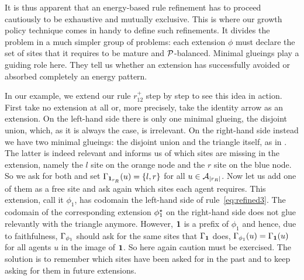 It is thus apparent that
an energy-based rule refinement has to proceed
cautiously to be exhaustive and mutually exclusive. %
This is where our growth policy technique
comes in handy to define such refinements.
It divides the problem in a much simpler group of problems:
each extension $\phi$ must declare the set of sites
that it requires to be mature and $\mathcal{P}$-balanced.
Minimal glueings play a guiding role here.
They tell us whether an extension has successfully
avoided or absorbed completely an energy pattern.

In our example, we extend our rule $r^+_{12}$
step by step to see this idea in action.
First take no extension at all or,
more precisely, take the identity arrow as an extension.
On the left-hand side there is only one minimal glueing,
the disjoint union, which, as it is always the case,
is irrelevant.
On the right-hand side instead we have two minimal glueings:
the disjoint union and the triangle itself,
as in .
The latter is indeed relevant and informs us
of which sites are missing in the extension,
namely the $l$ site on the orange node
and the $r$ site on the blue node.
So we ask for both and set $\Gamma_{\boldsymbol{\mathbf{1}}_{r_R}}(u) = \left\{ l,r \right\}$
for all $u \in \mathcal{A}_{\left|r_R\right|}$.
Now let us add one of them as a free site
and ask again which sites each agent requires.
This extension, call it $\phi_1$, has codomain
the left-hand side of rule~\ref{eq:refined3}.
The codomain of the corresponding extension $\phi_1^\star$
on the right-hand side
does not glue relevantly with the triangle anymore.
However, $\boldsymbol{\mathbf{1}}$ is a prefix of $\phi_1$
and hence, due to faithfulness,
$\Gamma_{\phi_1}$ should ask for the same sites
that $\Gamma_{\boldsymbol{\mathbf{1}}}$ does,
\ie $\Gamma_{\phi_1}(u) = \Gamma_{\boldsymbol{\mathbf{1}}}(u)$
for all agents $u$ in the image of $\boldsymbol{\mathbf{1}}$. %
So here again caution must be exercised.
The solution is to remember which sites have been asked for
in the past and to keep asking for them in future extensions.

